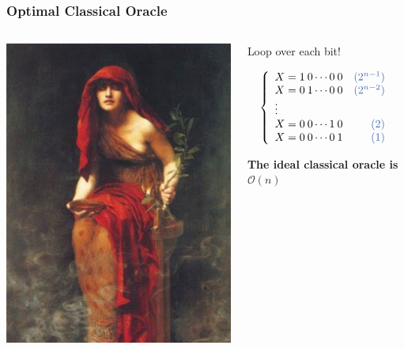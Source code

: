 \documentclass[aspectratio=169,11pt,hyperref={colorlinks=true}]{beamer}
\begin{document}
\begin{frame}
    \frametitle{Optimal Classical Oracle}
	\begin{columns}
        \begin{column}{.3\textwidth}
            \centering
            \includegraphics[width=\textwidth]{the_oracle.jpg}
        \end{column}
        \begin{column}{.7\textwidth}
            \centering
            Loop over each bit!
            \begin{flushleft}
            \[\left \{
                \begin{array}{lr}
                    X = 1\>0 \dotsb 0\>0 & \color{ibm} (2^{n-1})\\
                    X = 0\>1 \dotsb 0\>0 & \color{ibm} (2^{n-2})\\
                   \vdots  \\
                    X = 0\>0 \dotsb 1\>0 & \color{ibm} (2)\\
                    X = 0\>0 \dotsb 0\>1  & \color{ibm} (1)
                 \end{array}
               \right.
           \]
            \end{flushleft}
            \begin{center}
            \large \textbf{The ideal classical oracle is $\mathcal{O}(n)$}
            \end{center}
        \end{column}
    \end{columns}
\end{frame}
\end{document}
